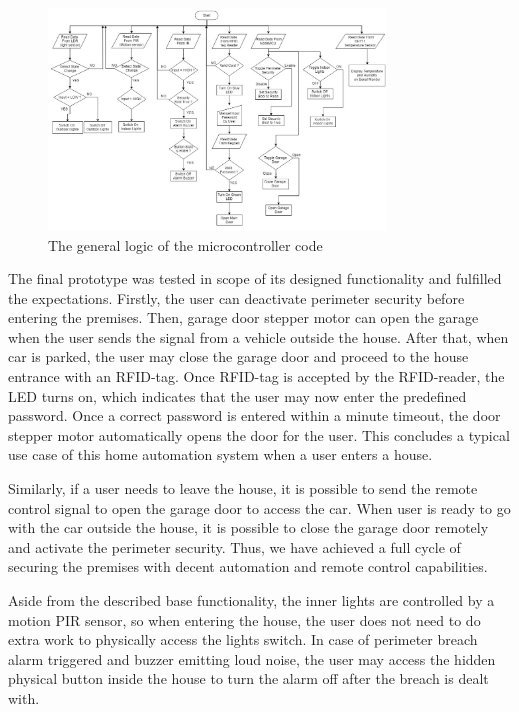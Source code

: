 \documentclass[journal,onecolumn]{IEEEtran}
\begin{document}
\begin{figure}[H]
  \includegraphics[width=0.8\textwidth]{img/img4.png}
  \caption{The general logic of the microcontroller code}
  \label{fig:img4}
\end{figure}

The final prototype was tested in scope of its designed functionality and fulfilled the expectations. Firstly, the user can deactivate perimeter security before entering the premises. Then, garage door stepper motor can open the garage when the user sends the signal from a vehicle outside the house. After that, when car is parked, the user may close the garage door and proceed to the house entrance with an RFID-tag. Once RFID-tag is accepted by the RFID-reader, the LED turns on, which indicates that the user may now enter the predefined password. Once a correct password is entered within a minute timeout, the door stepper motor automatically opens the door for the user. This concludes a typical use case of this home automation system when a user enters a house.

Similarly, if a user needs to leave the house, it is possible to send the remote control signal to open the garage door to access the car. When user is ready to go with the car outside the house, it is possible to close the garage door remotely and activate the perimeter security. Thus, we have achieved a full cycle of securing the premises with decent automation and remote control capabilities.

Aside from the described base functionality, the inner lights are controlled by a motion PIR sensor, so when entering the house, the user does not need to do extra work to physically access the lights switch. In case of perimeter breach alarm triggered and buzzer emitting loud noise, the user may access the hidden physical button inside the house to turn the alarm off after the breach is dealt with.
\end{document}
